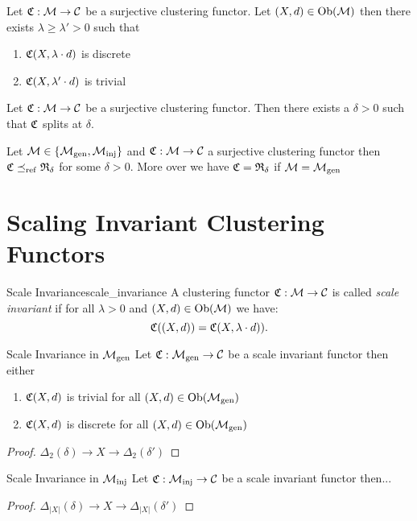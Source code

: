 \begin{lemma}{}{}
\newresult
Let $\mathfrak{C}: \mathcal{M} \to \mathcal{C}$ be a surjective clustering functor. Let $(X,d) \in \mathrm {Ob}(\mathcal{M})$ then there exists $\lambda \geq \lambda' > 0$ such that
\begin{enumerate}
    \item $\mathfrak{C}(X, \lambda \cdot d)$ is discrete
    \item $\mathfrak{C}(X, \lambda' \cdot d)$ is trivial
\end{enumerate}
\end{lemma}

\begin{corollary}{}{}
\newresult

Let $\mathfrak{C}: \mathcal{M} \to \mathcal{C}$ be a surjective clustering functor. Then there exists a $\delta > 0$ such that $\mathfrak{C}$ splits at $\delta$.
\end{corollary}

\begin{corollary}{}{}
\newresult
Let $\mathcal{M} \in \{{\mathcal{M}_\mathrm{gen}}, {\mathcal{M}_\mathrm{inj}}\}$ and $\mathfrak{C}: \mathcal{M} \to \mathcal{C}$ a surjective clustering functor then $\mathfrak{C} \preceq_\mathrm{ref} \mathfrak{R}_\delta$ for some $\delta > 0$. More over we have $\mathfrak{C} = \mathfrak{R}_\delta$ if $\mathcal{M} = {\mathcal{M}_\mathrm{gen}}$
\end{corollary}

\section{Scaling Invariant Clustering Functors}

\begin{definition}{Scale Invariance}{scale_invariance}
A clustering functor $\mathfrak{C}: \mathcal{M} \to \mathcal{C}$ is called \emph{scale invariant} if for all $\lambda > 0$ and $(X,d) \in \mathrm {Ob}(\mathcal{M})$ we have:
\begin{equation*}
    \mathfrak{C}((X,d)) = \mathfrak{C}(X,\lambda \cdot d)).
\end{equation*}
\end{definition}

\begin{proposition}{Scale Invariance in ${\mathcal{M}_\mathrm{gen}}$}{}
Let $\mathfrak{C}: {\mathcal{M}_\mathrm{gen}} \to \mathcal{C}$ be a scale invariant functor then either
\begin{enumerate}
    \item $\mathfrak{C}(X,d)$ is trivial for all $(X,d) \in \mathrm {Ob}({\mathcal{M}_\mathrm{gen}})$
    \item $\mathfrak{C}(X,d)$ is discrete for all $(X,d) \in \mathrm {Ob}({\mathcal{M}_\mathrm{gen}})$
\end{enumerate}
\end{proposition}

\begin{proof}
$\Delta_2(\delta) \to X \to \Delta_2(\delta')$
\end{proof}

\begin{proposition}{Scale Invariance in ${\mathcal{M}_\mathrm{inj}}$}{}
Let $\mathfrak{C}: {\mathcal{M}_\mathrm{inj}} \to \mathcal{C}$ be a scale invariant functor then...
\end{proposition}

\begin{proof}
$\Delta_{|X|}(\delta) \to X \to \Delta_{|X|}(\delta')$
\end{proof}